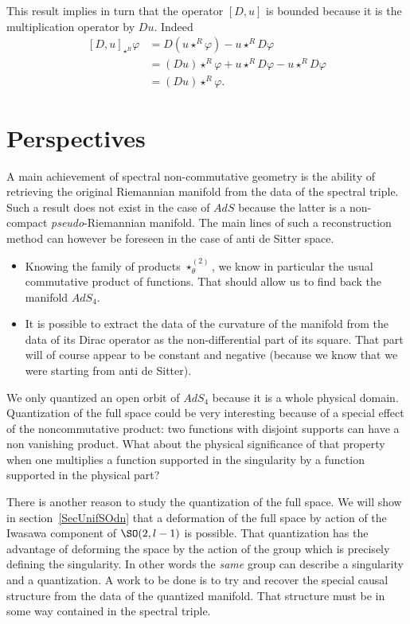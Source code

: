 This result implies in turn that the operator $[D,u]$ is bounded because it is the multiplication operator by $Du$. Indeed
\[
	\begin{split}
		[D,u]_{\star^R}\varphi
		&=D(u\star^R \varphi)-u\star^R D\varphi\\
		&= (Du)\star^R\varphi+u\star^R D\varphi-u\star^R D\varphi\\
		&=(Du)\star^R\varphi.
	\end{split}
\]

\section{Perspectives}

A main achievement of spectral non-commutative geometry is the ability of retrieving the original Riemannian manifold from the data of the spectral triple. Such a result does not exist in the case of $AdS$ because the latter is a non-compact \emph{pseudo}-Riemannian manifold. The main lines of such a reconstruction method can however be foreseen in the case of anti de Sitter space.
\begin{itemize}
	\item Knowing the family of products $\star^{(2)}_{\theta}$, we know in particular the usual commutative product of functions. That should allow us to find back the manifold $AdS_4$.
	\item It is possible to extract the data of the curvature of the manifold from the data of its Dirac operator as the non-differential part of its square. That part will of course appear to be constant and negative (because we know that we were starting from anti de Sitter).
\end{itemize}

We only quantized an open orbit of $AdS_4$ because it is a whole physical domain. Quantization of the full space could be very interesting because of a special effect of the noncommutative product: two functions with disjoint supports can have a non vanishing product. What about the physical significance of that property when one multiplies a function supported in the singularity by a function supported in the physical part?

There is another reason to study the quantization of the full space. We will show in section~\ref{SecUnifSOdn} that a deformation of the full space by action of the Iwasawa component of $\SO(2,l-1)$ is possible. That quantization has the advantage of deforming the space by the action of the group which is precisely defining the singularity. In other words the \emph{same} group can describe a singularity and a quantization. A work to be done is to try and recover the special causal structure from the data of the quantized manifold. That structure must be in some way contained in the spectral triple.


